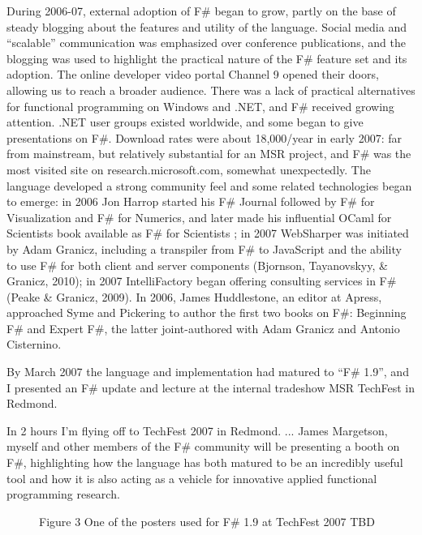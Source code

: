\documentclass[acmsmall,review]{acmart}\settopmatter{printfolios=true,printccs=false,printacmref=false}
\begin{document}
During 2006-07, external adoption of F\# began to grow, partly on the base of steady blogging about the features and utility of the language.  Social media and “scalable” communication was emphasized over conference publications, and the blogging was used to highlight the practical nature of the F\# feature set and its adoption. The online developer video portal Channel 9 opened their doors, allowing us to reach a broader audience.  There was a lack of practical alternatives for functional programming on Windows and .NET, and F\# received growing attention.  .NET user groups existed worldwide, and some began to give presentations on F\#. Download rates were about 18,000/year in early 2007: far from mainstream, but relatively substantial for an MSR project, and F\# was the most visited site on research.microsoft.com, somewhat unexpectedly. The language developed a strong community feel and some related technologies began to emerge: in 2006 Jon Harrop started his F\# Journal followed by F\# for Visualization and F\# for Numerics, and later made his influential OCaml for Scientists book available as F\# for Scientists ; in 2007 WebSharper was initiated by Adam Granicz, including a transpiler from F\# to JavaScript and the ability to use F\# for both client and server components (Bjornson, Tayanovskyy, \& Granicz, 2010); in 2007 IntelliFactory began offering consulting services in F\# (Peake \& Granicz, 2009).   In 2006, James Huddlestone, an editor at Apress, approached Syme and Pickering to author the first two books on F\#: Beginning F\# and Expert F\#, the latter joint-authored with Adam Granicz and Antonio Cisternino.    

By March 2007 the language and implementation had matured to “F\# 1.9”, and I presented an F\# update and lecture at the internal tradeshow MSR TechFest in Redmond.  

\begin{verbquote}
In 2 hours I'm flying off to TechFest 2007 in Redmond. ... James Margetson, myself and other members of the F\# community will be presenting a booth on F\#, highlighting how the language has both matured to be an incredibly useful tool and how it is also acting as a vehicle for innovative applied functional programming research.
\end{verbquote}

\begin{figure}
Figure 3 One of the posters used for F\# 1.9 at TechFest 2007
TBD
\end{figure}
\end{document}
